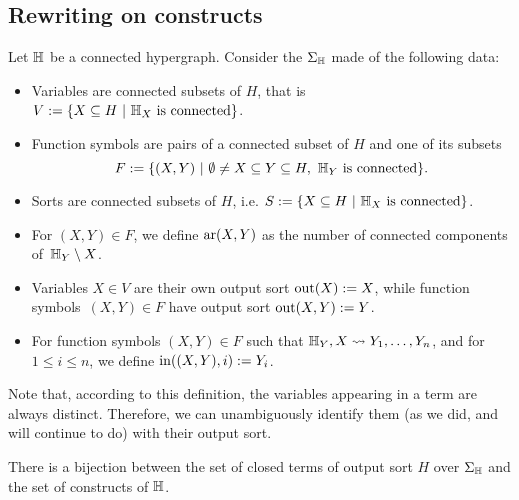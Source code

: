 
\subsection{Rewriting on constructs}
\label{ss:rewriting-constructs}

\begin{definition} \label{def:signature-hyper}
  Let ${\mathbb H}$ be a connected hypergraph. 
Consider the  $\Sigma_{\mathbb H}$ made of the following data: 
\begin{itemize}
  \item Variables are connected subsets of $H$, that is $V:=\{ X \subseteq H \ | \ \hyper{H}_{X} \text{ is connected}\}$. 
  \item Function symbols are pairs of a connected subset of $H$ and one of its subsets 
  $$F:=\{(X,Y) \ | \ \emptyset \neq X \subseteq Y \subseteq H, \ \hyper{H}_Y \text{ is connected}\}.$$
  \item Sorts are connected subsets of $H$, i.e. $S:=\{ X \subseteq H \ | \ {\mathbb H}_X \text{ is connected}\}$.
  \item For $(X,Y) \in F$, we define $\mathrm{ar}(X,Y)$ as the number of connected components of~${\mathbb H}_Y\setminus X$.
  \item Variables $X \in V$ are their own output sort $\operatorname{out}(X):=X$, while function symbols~$(X,Y) \in F$ have output sort $\operatorname{out}(X,Y):=Y$.
  \item For function symbols $(X,Y) \in F$ such that ${\mathbb H}_Y,X \leadsto Y_1,\ldots,Y_n$, and for $1 \leq i \leq n$, we define $\operatorname{in}((X,Y),i):=Y_i$.
\end{itemize}
\end{definition}

\begin{rem}
  Note that, according to this definition, the variables appearing in a term are always distinct. 
  Therefore, we can unambiguously identify them (as we did, and will continue to do) with their output sort.
\end{rem}

\begin{lemma} \label{l:bijection-terms}
  There is a bijection between the set of closed terms of output sort $H$ over $\Sigma_{\mathbb H}$ and the set of constructs of ${\mathbb H}$.
\end{lemma}

